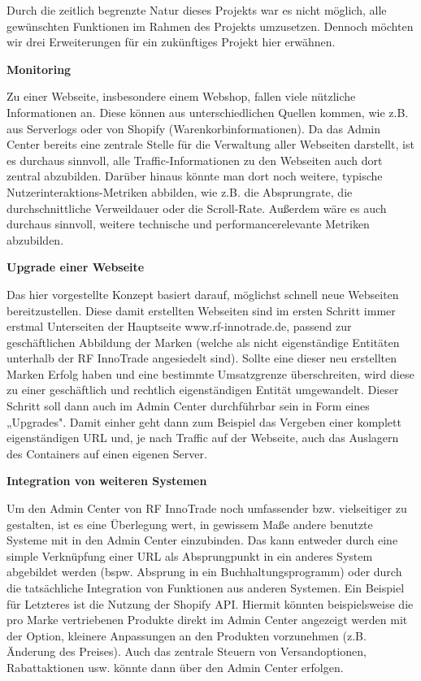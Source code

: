 Durch die zeitlich begrenzte Natur dieses Projekts war es nicht möglich, alle gewünschten Funktionen im Rahmen des Projekts umzusetzen. Dennoch möchten wir drei Erweiterungen für ein zukünftiges Projekt hier erwähnen.

\textbf{Monitoring}

Zu einer Webseite, insbesondere einem Webshop, fallen viele nützliche Informationen an. Diese können aus unterschiedlichen Quellen kommen, wie z.B. aus Serverlogs oder von Shopify (Warenkorbinformationen). Da das Admin Center bereits eine zentrale Stelle für die Verwaltung aller Webseiten darstellt, ist es durchaus sinnvoll, alle Traffic-Informationen zu den Webseiten auch dort zentral abzubilden. Darüber hinaus könnte man dort noch weitere, typische Nutzerinteraktions-Metriken abbilden, wie z.B. die Absprungrate, die durchschnittliche Verweildauer oder die Scroll-Rate. Außerdem wäre es auch durchaus sinnvoll, weitere technische und performancerelevante Metriken abzubilden.

\textbf{Upgrade einer Webseite}

Das hier vorgestellte Konzept basiert darauf, möglichst schnell neue Webseiten bereitzustellen. Diese damit erstellten Webseiten sind im ersten Schritt immer erstmal Unterseiten der Hauptseite www.rf-innotrade.de, passend zur geschäftlichen Abbildung der Marken (welche als nicht eigenständige Entitäten unterhalb der RF InnoTrade angesiedelt sind). Sollte eine dieser neu erstellten Marken Erfolg haben und eine bestimmte Umsatzgrenze überschreiten, wird diese zu einer geschäftlich und rechtlich eigenständigen Entität umgewandelt. Dieser Schritt soll dann auch im Admin Center durchführbar sein in Form eines „Upgrades". Damit einher geht dann zum Beispiel das Vergeben einer komplett eigenständigen URL und, je nach Traffic auf der Webseite, auch das Auslagern des Containers auf einen eigenen Server.

\textbf{Integration von weiteren Systemen}

Um den Admin Center von RF InnoTrade noch umfassender bzw. vielseitiger zu gestalten, ist es eine Überlegung wert, in gewissem Maße andere benutzte Systeme mit in den Admin Center einzubinden. Das kann entweder durch eine simple Verknüpfung einer URL als Absprungpunkt in ein anderes System abgebildet werden (bspw. Absprung in ein Buchhaltungsprogramm) oder durch die tatsächliche Integration von Funktionen aus anderen Systemen. Ein Beispiel für Letzteres ist die Nutzung der Shopify API. Hiermit könnten beispielsweise die pro Marke vertriebenen Produkte direkt im Admin Center angezeigt werden mit der Option, kleinere Anpassungen an den Produkten vorzunehmen (z.B. Änderung des Preises). Auch das zentrale Steuern von Versandoptionen, Rabattaktionen usw. könnte dann über den Admin Center erfolgen.